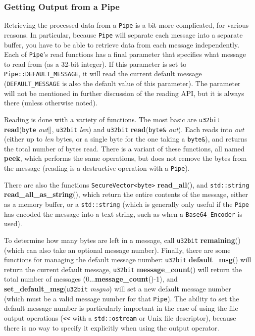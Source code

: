 \documentclass{article}
\newcommand{\function}[1]{\textbf{#1}}
\newcommand{\type}[1]{\texttt{#1}}
\renewcommand{\arg}[1]{\textsl{#1}}
\begin{document}
\subsubsection{Getting Output from a Pipe}

Retrieving the processed data from a \type{Pipe} is a bit more complicated, for
various reasons. In particular, because \type{Pipe} will separate each message
into a separate buffer, you have to be able to retrieve data from each message
independently. Each of \type{Pipe}'s read functions has a final parameter that
specifies what message to read from (as a 32-bit integer). If this parameter is
set to \type{Pipe::DEFAULT\_MESSAGE}, it will read the current default message
(\type{DEFAULT\_MESSAGE} is also the default value of this parameter). The
parameter will not be mentioned in further discussion of the reading API, but
it is always there (unless otherwise noted).

Reading is done with a variety of functions. The most basic are \type{u32bit}
\function{read}(\type{byte} \arg{out}[], \type{u32bit} \arg{len}) and
\type{u32bit} \function{read}(\type{byte\&} \arg{out}). Each reads into
\arg{out} (either up to \arg{len} bytes, or a single byte for the one taking a
\type{byte\&}), and returns the total number of bytes read. There is a variant
of these functions, all named \function{peek}, which performs the same
operations, but does not remove the bytes from the message (reading is a
destructive operation with a \type{Pipe}).

There are also the functions \type{SecureVector<byte>} \function{read\_all}(),
and \type{std::string} \function{read\_all\_as\_string}(), which return the
entire contents of the message, either as a memory buffer, or a
\type{std::string} (which is generally only useful if the \type{Pipe} has
encoded the message into a text string, such as when a \type{Base64\_Encoder}
is used).

To determine how many bytes are left in a message, call \type{u32bit}
\function{remaining}() (which can also take an optional message
number). Finally, there are some functions for managing the default message
number: \type{u32bit} \function{default\_msg}() will return the current default
message, \type{u32bit} \function{message\_count}() will return the total number
of messages (0...\function{message\_count}()-1), and
\function{set\_default\_msg}(\type{u32bit} \arg{msgno}) will set a new default
message number (which must be a valid message number for that \type{Pipe}). The
ability to set the default message number is particularly important in the case
of using the file output operations (\verb|<<| with a \type{std::ostream} or
Unix file descriptor), because there is no way to specify it explicitly when
using the output operator.
\end{document}
